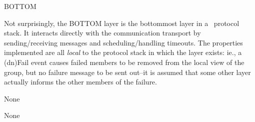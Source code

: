 %
%
%
\begin{Layer}{BOTTOM} 

Not surprisingly, the BOTTOM layer is the bottommost layer in a \ensemble\
protocol stack.  It interacts directly with the communication transport by
sending/receiving messages and scheduling/handling timeouts.  The properties
implemented are all \emph{local} to the protocol stack in which the layer
exists: ie., a (dn)Fail event causes failed members to be removed from the local
view of the group, but no failure message to be sent out--it is assumed that
some other layer actually informs the other members of the failure.

\begin{Protocol}
None
\end{Protocol}

\begin{Parameters}
\item None
\end{Parameters}


\end{Layer}
